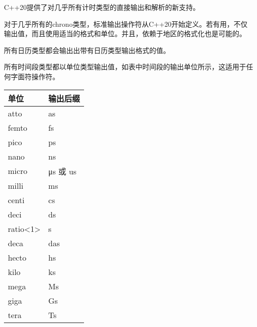 
C++20提供了对几乎所有计时类型的直接输出和解析的新支持。


对于几乎所有的chrono类型，标准输出操作符从C++20开始定义。若有用，不仅输出值，而且使用适当的格式和单位。并且，依赖于地区的格式化也是可能的。

所有日历类型都会输出出带有日历类型输出格式的值。

所有时间段类型都以单位类型输出值，如表中时间段的输出单位所示，这适用于任何字面符操作符。

\begin{longtable}[c]{|l|l|}
\hline
\textbf{单位}                          & \textbf{输出后缀} \\ \hline
\endfirsthead
%
\endhead
%
atto                                   & as                     \\ \hline
femto                                  & fs                     \\ \hline
pico                                   & ps                     \\ \hline
nano                                   & ns                     \\ \hline
micro                                  & μs 或 us               \\ \hline
milli                                  & ms                     \\ \hline
centi                                  & cs                     \\ \hline
deci                                   & ds                     \\ \hline
ratio\textless{}1\textgreater{}        & s                      \\ \hline
deca                                   & das                    \\ \hline
hecto                                  & hs                     \\ \hline
kilo                                   & ks                     \\ \hline
mega                                   & Ms                     \\ \hline
giga                                   & Gs                     \\ \hline
tera                                   & Ts                     \\ \hline

\end{longtable}
